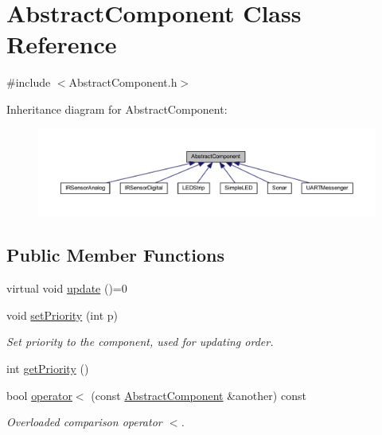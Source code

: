 \hypertarget{class_abstract_component}{}\section{Abstract\+Component Class Reference}
\label{class_abstract_component}


{\ttfamily \#include $<$Abstract\+Component.\+h$>$}



Inheritance diagram for Abstract\+Component\+:\nopagebreak
\begin{figure}[H]
\begin{center}
\leavevmode
\includegraphics[width=350pt]{class_abstract_component__inherit__graph}
\end{center}
\end{figure}
\subsection*{Public Member Functions}
\begin{DoxyCompactItemize}
\item 
virtual void \hyperlink{class_abstract_component_af25a90b8ab213762221c3b358d9873f3}{update} ()=0
\item 
void \hyperlink{class_abstract_component_a58a59a9ea6c3b4c86fb3bf98ff1eaaef}{set\+Priority} (int p)
\begin{DoxyCompactList}\small\item\em Set priority to the component, used for updating order. \end{DoxyCompactList}\item 
int \hyperlink{class_abstract_component_ac0b440d1d642ff1292ec3c544d75a8f1}{get\+Priority} ()
\item 
bool \hyperlink{class_abstract_component_a0c2e458144111c5f599c66f168516abc}{operator$<$} (const \hyperlink{class_abstract_component}{Abstract\+Component} \&another) const
\begin{DoxyCompactList}\small\item\em Overloaded comparison operator \textquotesingle{}$<$\textquotesingle{}. \end{DoxyCompactList}\end{DoxyCompactItemize}
